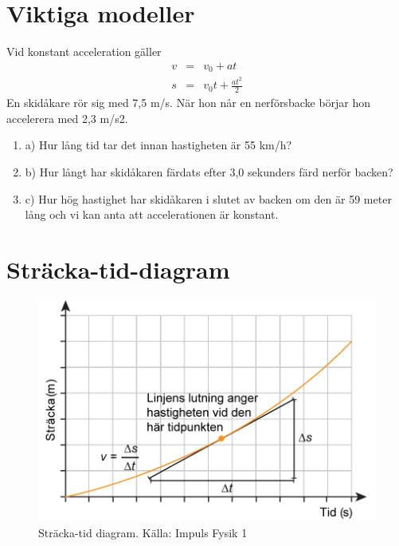 \documentclass[11pt]{article}
\begin{document}
    \section{Viktiga modeller}
    Vid konstant acceleration gäller
    \begin{eqnarray}
        v&=&v_0+at \\
        s&=&v_0 t +  \frac{at^2}{2}
    \end{eqnarray}
    En skidåkare rör sig med 7,5 m/s. När hon når en
    nerförsbacke börjar hon accelerera med 2,3 m/s2.
    \begin{enumerate}
        \item{a)} Hur lång tid tar det innan hastigheten är 55 km/h?
        \item{b)} Hur långt har skidåkaren färdats efter 3,0
        sekunders färd nerför backen?
        \item{c)} Hur hög hastighet har skidåkaren i slutet av
        backen om den är 59 meter lång och vi kan anta att
        accelerationen är konstant.
    \end{enumerate}
    \section{Sträcka-tid-diagram}
\begin{figure}[!h]
\includegraphics[width=\textwidth]{../images/chapter3/DistTime.png}
\caption{Sträcka-tid diagram. Källa: Impuls Fysik 1}
\end{figure}
\clearpage
\end{document}

